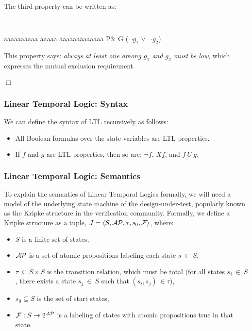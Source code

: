 \begin{example}
{\noindent
The third property can be written as: 
{\tt
\begin{tabbing}
a\= aa\= aaa\= aaaa \= aaaaa \= aaaaaa\= aaaaaaa\= \kill
\>\>\>\>\>\> P3: G ($\neg g_1$ $\lor$ $\neg g_2$)
\end{tabbing}
}
\noindent
This property says: {\em always at least one among $g_1$ and $g_2$ must be
low}, which expresses the mutual exclusion requirement.
} $\Box$
\end{example}

\subsubsection{Linear Temporal Logic: Syntax} \label{sec2.1.1.1}
We can define the syntax of LTL recursively as follows:
\begin{itemize}

\item All Boolean formulas over the state variables are LTL properties.

\item If $f$ and $g$ are LTL properties, then so are: $\neg f$, $Xf$, and
	$f\ U\ g$.

\end{itemize}

\subsubsection{Linear Temporal Logic: Semantics} \label{sec2.1.1.2}
To explain the semantics of Linear Temporal Logics formally, we will need a 
model of the underlying state machine of the design-under-test, 
popularly known as the Kripke structure in the verification community.
Formally, we define a Kripke structure as a tuple,
$J = \langle S, {\cal AP}, \tau, s_0, {\cal F} \rangle$, where:
\begin{itemize}
\item $S$ is a finite set of states,
\item ${\cal AP}$ is a set of atomic propositions labeling each state
       $s \ \in \ S$,
\item $\tau\ \subseteq S \times S$ is the transition
      relation, which must be total (for all states $s_i\ \in\ S$,
      there exists a state $s_j\ \in\ S$ such that
      $(s_i,s_j)\ \in \tau$),
\item $s_0 \subseteq S$ is the set of start states,
\item ${\cal F}: S \rightarrow 2^{\cal AP}$
        is a labeling of states with atomic propositions true in that state.
\end{itemize} 

